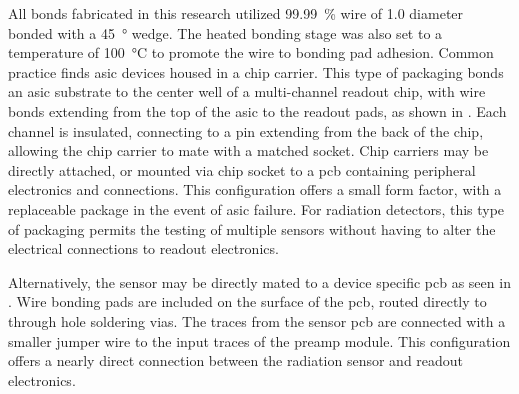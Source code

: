 \documentclass[../../main.tex]{subfiles}
\begin{document}
    All bonds fabricated in this research utilized \SI{99.99}{\percent}  wire of \SI{1.0}{\mil} diameter bonded with a \SI{45}{\degree} wedge.
    The heated bonding stage was also set to a temperature of \SI{100}{\celsius} to promote the  wire to  bonding pad adhesion.
    Common practice finds \gls{asic} devices housed in a chip carrier.
    This type of packaging bonds an \gls{asic} substrate to the center well of a multi-channel readout chip, with wire bonds extending from the top of the \gls{asic} to the readout pads, as shown in .
    Each channel is insulated, connecting to a pin extending from the back of the chip, allowing the chip carrier to mate with a matched socket.
    Chip carriers may be directly attached, or mounted via chip socket to a \gls{pcb} containing peripheral electronics and connections.
    This configuration offers a small form factor, with a replaceable package in the event of \gls{asic} failure.
    For radiation detectors, this type of packaging permits the testing of multiple sensors without having to alter the electrical connections to readout electronics.
    \par%
    Alternatively, the sensor may be directly mated to a device specific \gls{pcb} as seen in .
    Wire bonding pads are included on the surface of the \gls{pcb}, routed directly to through hole soldering vias.
    The traces from the sensor \gls{pcb} are connected with a smaller jumper wire to the input traces of the \gls{preamp} module.
    This configuration offers a nearly direct connection between the radiation sensor and readout electronics.
\end{document}
